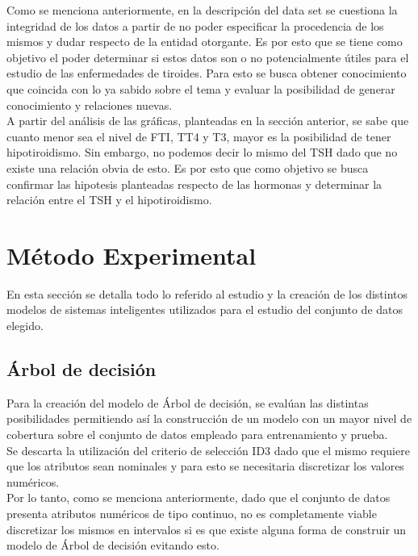 \documentclass[osajnl,twocolumn,showpacs,superscriptaddress,10pt,floatfix]{revtex4-1} %
\begin{document}
Como se menciona anteriormente, en la descripción del data set se cuestiona la integridad de los datos a partir de no poder especificar la procedencia de los mismos y dudar respecto de la entidad otorgante. Es por esto que se tiene como objetivo el poder determinar si estos datos son o no potencialmente útiles para el estudio de las enfermedades de tiroides. Para esto se busca obtener conocimiento que coincida con lo ya sabido sobre el tema y evaluar la posibilidad de generar conocimiento y relaciones nuevas. \\

A partir del análisis de las gráficas, planteadas en la sección anterior, se sabe que cuanto menor sea el nivel de FTI, TT4 y T3, mayor es la posibilidad de tener hipotiroidismo. Sin embargo, no podemos decir lo mismo del TSH dado que no existe una relación obvia de esto. Es por esto que como objetivo se busca confirmar las hipotesis planteadas respecto de las hormonas y determinar la relación entre el TSH y el hipotiroidismo. \\

\section{Método Experimental} \label{section:experimental_method}

En esta sección se detalla todo lo referido al estudio y la creación de los distintos modelos de sistemas inteligentes utilizados para el estudio del conjunto de datos elegido. \\

\subsection{Árbol de decisión}

Para la creación del modelo de Árbol de decisión, se evalúan las distintas posibilidades permitiendo así la construcción de un modelo con un mayor nivel de cobertura sobre el conjunto de datos empleado para entrenamiento y prueba. \\

Se descarta la utilización del criterio de selección ID3 dado que el mismo requiere que los atributos sean nominales y para esto se necesitaria discretizar los valores numéricos. \\

Por lo tanto, como se menciona anteriormente, dado que el conjunto de datos presenta atributos numéricos de tipo continuo, no es completamente viable discretizar los mismos en intervalos si es que existe alguna forma de construir un modelo de Árbol de decisión evitando esto. \\
\end{document}
